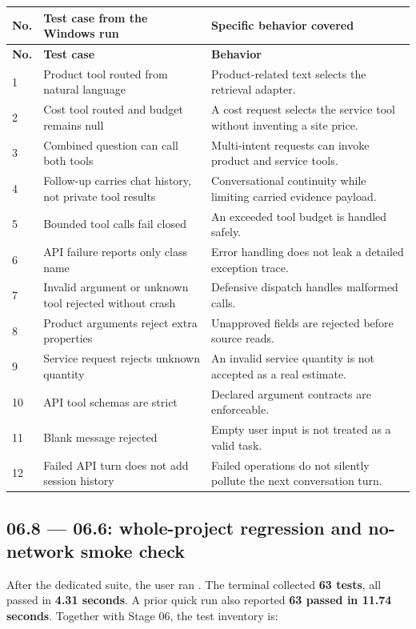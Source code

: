 \documentclass[11pt,a4paper]{article}
\DeclareRobustCommand{\code}[1]{{\ttfamily\small\detokenize{#1}}}
\begin{document}
\begin{longtable}{@{}L{8mm}L{68mm}L{64mm}@{}}
\toprule
\textbf{No.} & \textbf{Test case from the Windows run} & \textbf{Specific behavior covered}\\\midrule\endfirsthead
\toprule\textbf{No.} & \textbf{Test case} & \textbf{Behavior}\\\midrule{} & Product tool routed from natural language & Product-related text selects the retrieval adapter.\\
2 & Cost tool routed and budget remains null & A cost request selects the service tool without inventing a site price.\\
3 & Combined question can call both tools & Multi-intent requests can invoke product and service tools.\\
4 & Follow-up carries chat history, not private tool results & Conversational continuity while limiting carried evidence payload.\\
5 & Bounded tool calls fail closed & An exceeded tool budget is handled safely.\\
6 & API failure reports only class name & Error handling does not leak a detailed exception trace.\\
7 & Invalid argument or unknown tool rejected without crash & Defensive dispatch handles malformed calls.\\
8 & Product arguments reject extra properties & Unapproved fields are rejected before source reads.\\
9 & Service request rejects unknown quantity & An invalid service quantity is not accepted as a real estimate.\\
10 & API tool schemas are strict & Declared argument contracts are enforceable.\\
11 & Blank message rejected & Empty user input is not treated as a valid task.\\
12 & Failed API turn does not add session history & Failed operations do not silently pollute the next conversation turn.\\
\bottomrule
\end{longtable}

\subsection{06.8 --- 06.6: whole-project regression and no-network smoke check}
After the dedicated suite, the user ran \code{python -m pytest -v}. The terminal collected \textbf{63 tests}, all passed in \textbf{4.31 seconds}. A prior quick run also reported \textbf{63 passed in 11.74 seconds}. Together with Stage 06, the test inventory is:
\end{document}
